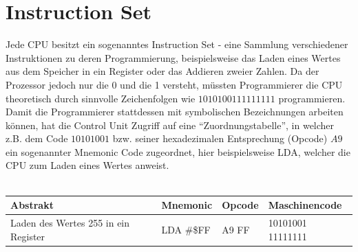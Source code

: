 \documentclass[a4paper,10pt]{report}
\begin{document}
\section{Instruction Set}
Jede CPU besitzt ein sogenanntes Instruction Set - eine Sammlung verschiedener Instruktionen zu deren Programmierung, beispielsweise das Laden eines Wertes aus dem Speicher in ein Register oder das Addieren zweier Zahlen. Da der Prozessor jedoch nur die 0 und die 1 versteht, müssten Programmierer die CPU theoretisch durch sinnvolle Zeichenfolgen wie $10101001 11111111$ programmieren. Damit die Programmierer stattdessen mit symbolischen Bezeichnungen arbeiten können, hat die Control Unit Zugriff auf eine "`Zuordnungstabelle"', in welcher z.B. dem Code $10101001$ bzw. seiner hexadezimalen Entsprechung (Opcode) $A9$ ein sogenannter Mnemonic Code zugeordnet, hier beispielsweise LDA, welcher die CPU zum Laden eines Wertes anweist.\\ \\
\begin{tabularx}{\textwidth}{l|l|l|l}
\textbf{Abstrakt} & \textbf{Mnemonic} & \textbf{Opcode} & \textbf{Maschinencode} \\\hline
Laden des Wertes 255 in ein Register & LDA \#\$FF & A9 FF & 10101001 11111111\\
\end{tabularx}
\end{document}
